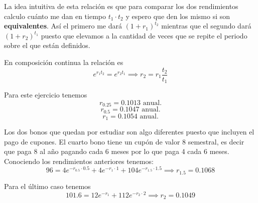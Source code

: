 \begin{problem}[2]
\obs La idea intuitiva de esta relación es que para comparar los dos rendimientos calculo cuánto me dan en tiempo $t_1\cdot t_2$ y espero que den los mismo si son \textbf{equivalentes}. Así el primero me dará $(1+r_1)^{t_2}$ mientras que el segundo dará $(1+r_2)^{t_1}$ puesto que elevamos a la cantidad de veces que se repite el periodo sobre el que están definidos.

En composición continua la relación es
\[e^{r_1t_2}=e^{r_2t_1} \implies r_2 = r_1\frac{t_2}{t_1}\]

Para este ejercicio tenemos
\[r_{0.25}=0.1013\text{ anual.}\]
\[r_{0.5}=0.1047\text{ anual.}\]
\[r_{1}=0.1054\text{ anual.}\]

Los dos bonos que quedan por estudiar son algo diferentes puesto que incluyen el pago de cupones. El cuarto bono tiene un cupón de valor 8 semestral, es decir que paga 8 al año pagando cada 6 meses por lo que paga 4 cada 6 meses. Conociendo los rendimientos anteriores tenemos:
\[96 = 4e^{-r_{0.5}\cdot 0.5}+4e^{-r_{1}\cdot 1} + 104e^{-r_{1.5}\cdot 1.5} \implies r_{1.5} = 0.1068\]

Para el último caso tenemos
\[101.6 = 12e^{-r_1}+112 e^{-r_2\cdot 2} \implies r_{2} = 0.1049\]
\end{problem}

